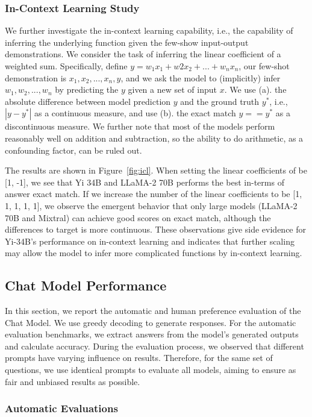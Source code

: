 \documentclass[numbers,sort&compress]{article}
\begin{document}
\subsubsection{In-Context Learning Study}
We further investigate the in-context learning capability, i.e., the capability of inferring the underlying function given the few-show input-output demonstrations.
We consider the task of inferring the linear coefficient of a weighted sum.
Specifically, define $y = w_1x_1 + w2x_2 + ... + w_nx_n$, our few-shot demonstration is $x_1, x_2, ..., x_n, y$, and we ask the model to (implicitly) infer $w_1, w_2, ..., w_n$ by predicting the $y$ given a new set of input $x$. 
We use (a). the absolute difference between model prediction $y$ and the ground truth $y^*$, i.e., $|y - y^*|$ as a continuous measure, and use (b). the exact match $y == y^*$ as a discontinuous measure.
We further note that most of the models perform reasonably well on addition and subtraction, so the ability to do arithmetic, as a confounding factor, can be ruled out. 

The results are shown in Figure~\ref{fig:icl}.
When setting the linear coefficients of be [1, -1], we see that Yi 34B and LLaMA-2 70B performs the best in-terms of answer exact match. 
If we increase the number of the linear coefficients to be [1, 1, 1, 1, 1], we observe the emergent behavior that only large models (LLaMA-2 70B and Mixtral) can achieve good scores on exact match, although the differences to target is more continuous. 
These observations give side evidence for Yi-34B's performance on in-context learning and indicates that further scaling may allow the model to infer more complicated functions by in-context learning.

\subsection{Chat Model Performance}

In this section, we report the automatic and human preference evaluation of the Chat Model. 
We use greedy decoding to generate responses. For the automatic evaluation benchmarks, we extract answers from the model's generated outputs and calculate accuracy. During the evaluation process, we observed that different prompts have varying influence on  results. Therefore, for the same set of questions, we use identical prompts to evaluate all models, aiming to ensure as fair and unbiased results as possible.

\subsubsection{Automatic Evaluations}
\end{document}
